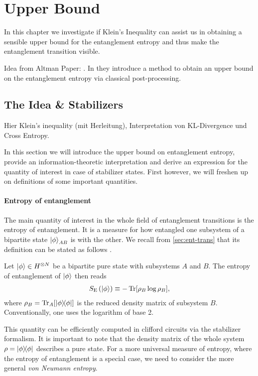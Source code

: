 \chapter{Upper Bound}
\label{ch:rel-ent}

In this chapter we investigate if Klein's Inequality can assist us in obtaining
a sensible upper bound for the entanglement entropy and thus make the
entanglement transition visible.

Idea from Altman Paper:
\cite{garrattProbingPostmeasurementEntanglement2023}.
In \cite{garrattProbingPostmeasurementEntanglement2023} they introduce a method
to obtain an upper bound on the entanglement entropy via classical
post-processing.

\section{The Idea \& Stabilizers}
Hier Klein's inequality (mit Herleitung), Interpretation von KL-Divergence und
Cross Entropy.

In this section we will introduce the upper bound on entanglement entropy,
provide an information-theoretic interpretation and derive an expression for
the quantity of interest in case of stabilizer states. First however, we will
freshen up on definitions of some important quantities.
\subsubsection{Entropy of entanglement}
The main quantity of interest in the whole field of entanglement transitions is
the entropy of entanglement. It is a measure for how entangled one subsystem of a
bipartite state $\ket{\phi}_{AB}$ is with the other. We recall from
\cref{sec:ent-trans} that its definition can be stated as follows
\cite{fattalEntanglementStabilizerFormalism2004}.
\begin{defn}\label{defn:entanglement-entropy}
  Let $\ket{\phi}\in H^{\otimes N}$ be a bipartite pure state with subsystems
  $A$ and $B$. The entropy of entanglement of $\ket{\phi}$ then reads
  \begin{align}
    S_\mathrm{E}\left(\ket{\phi}\right) \equiv - \Tr[\rho_B \log \rho_B],
  \end{align}
  where $\rho_B = \Tr_A[\dyad{\phi}]$ is the reduced density matrix of subsystem
  $B$. Conventionally, one uses the logarithm of base 2.
\end{defn}
This quantity can be efficiently computed in clifford circuits via the
stabilizer formalism. It is important to note that the density matrix of the
whole system $\rho = \dyad{\phi}$ describes a pure state. For a more universal
measure of entropy, where the entropy of entanglement is a special case, we
need to consider the more general \emph{von Neumann entropy}.
